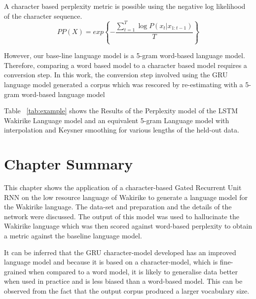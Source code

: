 A character based perplexity metric is possible using  the negative log likelihood of the character sequence.
\begin{equation}
    PP(X)=exp\left\{−\frac{\sum_{t=1}^T\log P(x_t|x_{1:t−1})}{T}\right\}
\label{ch5_eq3_ppx}
\end{equation}

However, our base-line language model is a 5-gram word-based language model.  Therefore, comparing a word based model to a character based model requires a conversion step. In this work, the conversion step involved using the GRU language model generated a corpus which was rescored by re-estimating with a 5-gram word-based language model

Table ~\ref{tab:example} shows the Results of the Perplexity model of the LSTM Wakirike Language model and an equivalent 5-gram Language model with interpolation and Keysner smoothing \citep{Heafield-estimate} for various lengths of the held-out data.
\stopblue

\section{Chapter Summary}
This chapter shows the application of a character-based Gated Recurrent Unit RNN on the low resource language of Wakirike to generate a language model for the Wakirike language.  The data-set and preparation and the details of the network were discussed.  The output of this model was used to hallucinate the Wakirike language which was then scored against word-based perplexity to obtain a metric against the baseline language model.

It can be inferred that the GRU character-model developed has an improved language model and because it is based on a character-model, which is fine-grained when compared to a word model, it is likely to generalise data better when used in practice and is less biased than a word-based model.  This can be observed from the fact that the output corpus produced a larger vocabulary size.

